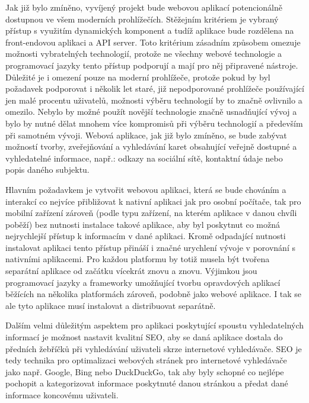 \begin{itemize}
\begin{itemize}
		Jak již bylo zmíněno, vyvíjený projekt bude webovou aplikací potencionálně dostupnou ve všem moderních prohlížečích.
		Stěžejním kritériem je vybraný přístup s využitím dynamických komponent a tudíž aplikace bude rozdělena
		na front-endovou aplikaci a \ac{API} server.
		Toto kritérium zásadním způsobem omezuje možnosti vybratelných technologií, protože ne všechny webové technologie
		a programovací jazyky tento přístup podporují a mají pro něj připravené nástroje.
		Důležité je i omezení pouze na moderní prohlížeče, protože pokud by byl požadavek podporovat i několik let staré,
		již nepodporované prohlížeče používající jen malé procentu uživatelů, možnosti výběru technologií by to značně
		ovlivnilo a omezilo.
		Nebylo by možné použít novější technologie značně usnadňující vývoj a bylo by nutné dělat mnohem více kompromisů
		při výběru technologií a především při samotném vývoji.
		Webová aplikace, jak již bylo zmíněno, se bude zabývat možností tvorby, zveřejňování a vyhledávání
		karet obsahující veřejně dostupné a vyhledatelné informace, např.: odkazy na sociální sítě,
		kontaktní údaje nebo popis daného subjektu.

		Hlavním požadavkem je vytvořit webovou aplikaci, která se bude chováním a interakcí co nejvíce přibližovat
		k nativní aplikaci jak pro osobní počítače, tak pro mobilní zařízení zároveň (podle typu zařízení, na kterém aplikace
		v danou chvíli poběží) bez nutnosti instalace takové aplikace, aby byl poskytnut co možná nejrychlejší přístup
		k informacím v dané aplikaci.
		Kromě odpadající nutnosti instalovat aplikaci tento přístup přináší i značné urychlení vývoje v porovnání s
		nativními aplikacemi.
		Pro každou platformu by totiž musela být tvořena separátní aplikace od začátku vícekrát znovu a znovu.
		Výjimkou jsou programovací jazyky a frameworky umožňující tvorbu opravdových aplikací běžících na několika
		platformách zároveň, podobně jako webové aplikace.
		I tak se ale tyto aplikace musí instalovat a distribuovat separátně.

		Dalším velmi důležitým aspektem pro aplikaci poskytující spoustu vyhledatelných informací je možnost nastavit
		kvalitní SEO, aby se daná aplikace dostala do předních žebříčků při vyhledávání uživateli skrze internetové
		vyhledávače.
		\noindent\Ac{SEO} je tedy technika pro optimalizaci webových stránek pro internetové vyhledávače jako např.
		Google, Bing nebo DuckDuckGo, tak aby byly schopné co nejlépe pochopit a kategorizovat informace poskytnuté
		danou stránkou a předat dané informace koncovému uživateli. \cite{what_is_seo}


\end{itemize}
\end{itemize}
